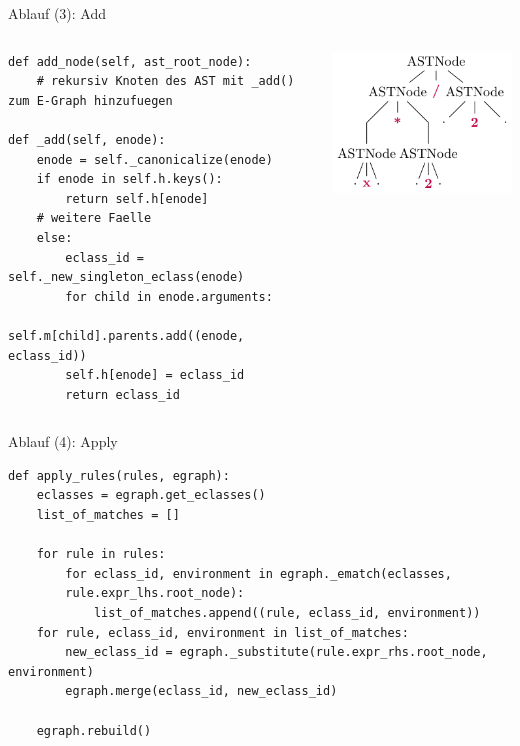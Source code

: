 \begin{frame}[fragile]{Ablauf (3): Add}
    \begin{columns}[c]
\begin{verbatim}    
def add_node(self, ast_root_node): 
    # rekursiv Knoten des AST mit _add() zum E-Graph hinzufuegen 

def _add(self, enode): 
    enode = self._canonicalize(enode)
    if enode in self.h.keys(): 
        return self.h[enode]
    # weitere Faelle 
    else:
        eclass_id = self._new_singleton_eclass(enode)
        for child in enode.arguments:
            self.m[child].parents.add((enode, eclass_id)) 
        self.h[enode] = eclass_id
        return eclass_id
\end{verbatim}
            \includegraphics[scale=1]{utils/ast.pdf}
    \end{columns}
\end{frame}

\begin{frame}[fragile]{Ablauf (4): Apply}
\begin{verbatim}    
def apply_rules(rules, egraph):
    eclasses = egraph.get_eclasses()
    list_of_matches = []

    for rule in rules:
        for eclass_id, environment in egraph._ematch(eclasses, 
        rule.expr_lhs.root_node):
            list_of_matches.append((rule, eclass_id, environment))
    for rule, eclass_id, environment in list_of_matches:
        new_eclass_id = egraph._substitute(rule.expr_rhs.root_node, environment)
        egraph.merge(eclass_id, new_eclass_id)
        
    egraph.rebuild()
\end{verbatim}
\end{frame}

